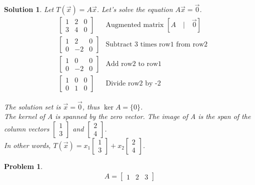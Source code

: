 \documentclass{article}
\newtheorem{problem}{Problem}
\newtheorem*{solution}{Solution}
\begin{document}
\begin{solution}
Let $T(\vec{x}) = A\vec{x}$. Let's solve the equation $A\vec{x} = \vec{0}$.
\begin{align*}
&\left[\begin{array}{cc|c}1 & 2 & 0 \\ 3 & 4 & 0\end{array}\right] & \textrm{Augmented matrix } \left[A \quad \vert \quad \vec{0}\right] \\
&\left[\begin{array}{cc|c}1 & 2 & 0 \\ 0 & -2 & 0\end{array}\right] & \textrm{Subtract 3 times row1 from row2} \\
&\left[\begin{array}{cc|c}1 & 0 & 0 \\ 0 & -2 & 0\end{array}\right] & \textrm{Add row2 to row1} \\
&\left[\begin{array}{cc|c}1 & 0 & 0 \\ 0 & 1 & 0\end{array}\right] & \textrm{Divide row2 by -2}
\end{align*}

The solution set is $\vec{x} = \vec{0}$, thus $\ker A = \{0\}$. \\

The kernel of A is spanned by the zero vector. The image of A is the span of the column vectors $\begin{bmatrix}1 \\ 3 \end{bmatrix}$ and $\begin{bmatrix}2 \\ 4 \end{bmatrix}$. \\

In other words, $T(\vec{x}) = x_{1} \begin{bmatrix}1 \\ 3 \end{bmatrix} + x_{2} \begin{bmatrix}2 \\ 4 \end{bmatrix}$.
\end{solution}

\begin{problem}
\begin{align*}
A = \begin{bmatrix}1 & 2 & 3 \end{bmatrix}
\end{align*}
\end{problem}
\end{document}

